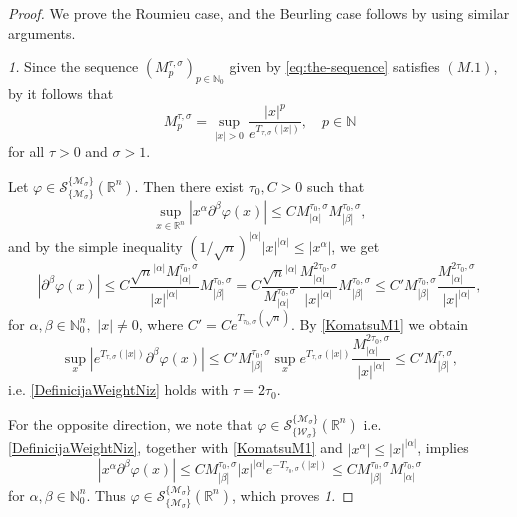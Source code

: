 \documentclass{article}
\theoremstyle{thmstyleone}
\theoremstyle{thmstyletwo}%
\theoremstyle{thmstylethree}%
\begin{document}
\begin{proof}
We prove the Roumieu case, and the Beurling case follows by using similar arguments.

{\em 1.}
Since the sequence $(M^{\tau,\sigma}_p)_{p\in\mathbb{N}_0}$ given by 
\eqref{eq:the-sequence} satisfies $(M.1)$, 
by \cite[Proposition 3.2]{Komatsuultra1}
it follows that
\begin{equation}
\label{KomatsuM1}
M^{\tau,\sigma}_p=\sup_{|x|> 0}\frac{|x|^p}{e^{T_{\tau,\sigma}(|x|)}},\quad p\in\mathbb{N}
\end{equation}
for all $\tau>0$ and $\sigma>1$.

Let $\varphi\in \mathcal S_{\{\mathcal{M}_\sigma \} }^{ \{\mathcal{M}_\sigma\}}  (\mathbb R^n)$. Then there exist $\tau_0, C>0$ such that
$$
\sup_{x \in  \mathbb R^n}|x^\alpha \partial^\beta \varphi(x)|\leq C M^{\tau_0,\sigma}_{|\alpha|} 
   M^{\tau_0,\sigma}_{|\beta|},
   $$ and by the simple inequality $(1/\sqrt{n})^{|\alpha|}|x|^{|\alpha|}\leq |x^{\alpha}|$, we get
$$
|\partial^\beta \varphi(x)|\leq C 
\frac{\sqrt{n}^{|\alpha|} M^{\tau_0,\sigma}_{|\alpha|}}{|x|^{|\alpha|}} 
   M^{\tau_0,\sigma}_{|\beta|}= C \frac{\sqrt{n}^{|\alpha|}}{M^{\tau_0,\sigma}_{|\alpha|}} \frac{ M^{2\tau_0,\sigma}_{|\alpha|}}{|x|^{|\alpha|}} M^{\tau_0,\sigma}_{|\beta|}\leq C' M^{\tau_0,\sigma}_{|\beta|}  \frac{ M^{2\tau_0,\sigma}_{|\alpha|}}{|x|^{|\alpha|}}, $$ for $\alpha,\beta \in \mathbb{N}_0^n,$ 
   $|x|\not=0$, where $C'=C e^{T_{\tau_0,\sigma}(\sqrt{n})}$. By \eqref{KomatsuM1} we     obtain 
$$
 \sup_{x}| e^{T_{\tau,\sigma}(|x|)} \partial^\beta \varphi(x)|\leq 
  C' M^{\tau_0,\sigma}_{|\beta|}  \sup_{x} e^{T_{\tau,\sigma}(|x|)} \frac{ M^{2\tau_0,\sigma}_{|\alpha|}}{|x|^{|\alpha|}} \leq
 C'     M^{\tau,\sigma}_{|\beta|},
$$
i.e. \eqref{DefinicijaWeightNiz} holds with $\tau=2\tau_0$.

\par

For the opposite direction, we note that
$\varphi\in 
\mathcal S_{\{\mathcal{W}_\sigma \} }^{ \{\mathcal{M}_\sigma\}} (\mathbb R^n)$ i.e.
\eqref{DefinicijaWeightNiz}, together with  \eqref{KomatsuM1} and $|x^{\alpha}|\leq |x|^{|\alpha|}$,
implies
$$
|x^{\alpha} \partial^\beta \varphi(x)|
\leq 
C M^{\tau_0,\sigma}_{|\beta|} |x|^{|\alpha|}
e^{-T_{\tau_0, \sigma}(|x|)} 
\leq 
C  M^{\tau_0,\sigma}_{|\beta|}
M^{\tau_0,\sigma}_{|\alpha|}
$$ 
for $\alpha, \beta \in \mathbb{N}_0^n$.
Thus  $\varphi\in \mathcal S_{\{\mathcal{M}_\sigma \} }^{ \{\mathcal{M}_\sigma\}}  (\mathbb R^n)$, which proves {\em 1.}



\end{proof}
\end{document}
